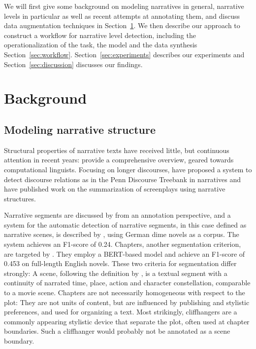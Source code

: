 \documentclass[10pt, a4paper]{article}
\begin{document}
We will first give some background on modeling narratives in general, narrative levels in particular as well as recent attempts at annotating them,  and discuss data augmentation techniques in Section~\ref{sec:background}. We then describe our approach to construct a workflow for narrative level detection, including the operationalization of the task, the model and the data synthesis Section~\ref{sec:workflow}. Section~\ref{sec:experiments} describes our experiments and Section~\ref{sec:discussion} discusses our findings. 

\section{Background}
\label{sec:background}

\subsection{Modeling narrative structure}

Structural properties of narrative texts have received little, but continuous attention in recent years:   provide a comprehensive overview, geared towards computational linguists. Focusing on longer discourses,  have proposed a system to detect discourse relations as in the Penn Discourse Treebank in narratives and  have published work on the summarization of screenplays using narrative structures. 

Narrative segments are discussed by  from an annotation perspective, and a system for the automatic detection of narrative segments, in this case defined as narrative scenes, 
is described by , using German dime novels as a corpus. The system achieves an F1-score of \num{0.24}. Chapters, another segmentation criterion, are targeted by . They employ a BERT-based model and achieve an F1-score of \num{0.453} on full-length English novels. These two criteria for segmentation differ strongly: A scene, following the definition by , is a textual segment with a continuity of narrated time, place, action and character constellation, comparable to a movie scene. Chapters are not necessarily homogeneous with respect to the plot: 
They are not units of content, but are influenced by publishing and stylistic preferences, and used for organizing a text. Most strikingly, cliffhangers are a commonly appearing stylistic device that separate the plot, often used at chapter boundaries. Such a cliffhanger would probably not be annotated as a scene boundary.
\end{document}
